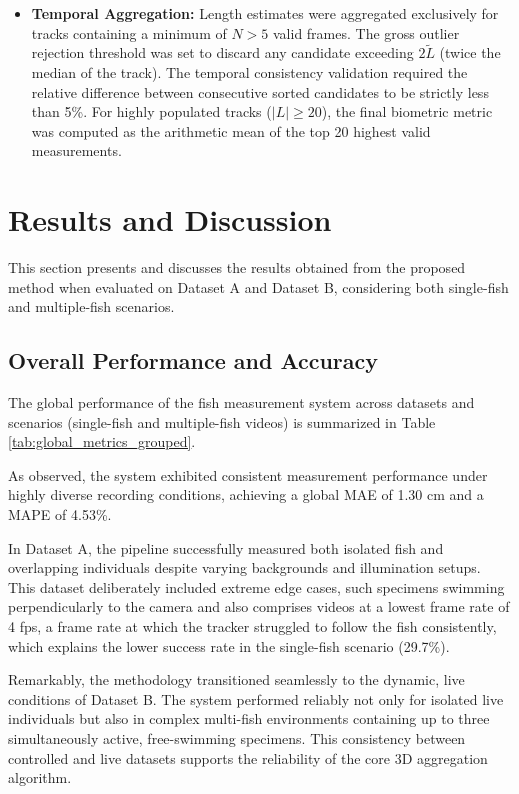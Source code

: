 \documentclass[utf8]{FrontiersinHarvard} %
\begin{document}
\begin{itemize}
    
    \item \textbf{Temporal Aggregation:}
    Length estimates were aggregated exclusively for tracks containing a minimum of $N > 5$ valid frames. The gross outlier rejection threshold was set to discard any candidate exceeding $2\tilde{L}$ (twice the median of the track). The temporal consistency validation required the relative difference between consecutive sorted candidates to be strictly less than 5\%. For highly populated tracks ($|L| \ge 20$), the final biometric metric was computed as the arithmetic mean of the top 20 highest valid measurements.


\end{itemize}



\section{Results and Discussion}\label{sec::results}

This section presents and discusses the results obtained from the proposed method when evaluated on Dataset A and Dataset B, considering both single-fish and multiple-fish scenarios. 

\subsection{Overall Performance and Accuracy}

The global performance of the fish measurement system across datasets and scenarios (single-fish and multiple-fish videos) is summarized in Table \ref{tab:global_metrics_grouped}.


As observed, the system exhibited consistent measurement performance under highly diverse recording conditions, achieving a global MAE of 1.30 cm and a MAPE of 4.53\%.



In Dataset A, the pipeline successfully measured both isolated fish and overlapping individuals despite varying backgrounds and illumination setups. This dataset deliberately included extreme edge cases, such specimens swimming perpendicularly to the camera and also comprises videos at a lowest frame rate of 4 fps, a frame rate at which the tracker struggled to follow the fish consistently, which explains the lower success rate in the single-fish scenario (29.7\%).

Remarkably, the methodology transitioned seamlessly to the dynamic, live conditions of Dataset B. The system performed reliably not only for isolated live individuals but also in complex multi-fish environments containing up to three simultaneously active, free-swimming specimens. This consistency between controlled and live datasets supports the reliability of the core 3D aggregation algorithm.
\end{document}
